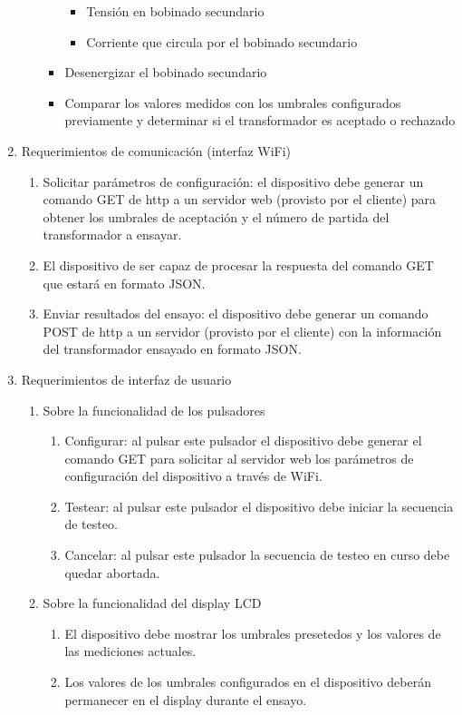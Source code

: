 \documentclass[11pt]{charter}
\begin{document}
\begin{enumerate}
\begin{enumerate}
\begin{itemize}
\begin{itemize}
			\item Tensión en bobinado secundario
			\item Corriente que circula por el bobinado secundario
			\end{itemize}
		\item Desenergizar el bobinado secundario
		\item Comparar los valores medidos con los umbrales configurados previamente y determinar si el transformador es aceptado o rechazado
		\end{itemize}
	\end{enumerate}	
\item Requerimientos de comunicación (interfaz WiFi)
	\begin{enumerate}
	\item Solicitar parámetros de configuración: el dispositivo debe generar un comando GET de http a un servidor web (provisto por el cliente) para obtener los umbrales de aceptación y el número de partida del transformador a ensayar.
	\item El dispositivo de ser capaz de procesar la respuesta del comando GET que estará en formato JSON.
	\item Enviar resultados del ensayo: el dispositivo debe generar un comando POST de http a un servidor (provisto por el cliente) con la información del transformador ensayado en formato JSON.
	\end{enumerate}
\item Requerimientos de interfaz de usuario
	\begin{enumerate}
	\item Sobre la funcionalidad de los pulsadores
		\begin{enumerate}
		\item Configurar: al pulsar este pulsador el dispositivo debe generar el comando GET para solicitar al servidor web los parámetros de configuración del dispositivo a través de WiFi.
		\item Testear: al pulsar este pulsador el dispositivo debe iniciar la secuencia de testeo.
		\item Cancelar: al pulsar este pulsador la secuencia de testeo en curso debe quedar abortada.
		\end{enumerate}
	\item Sobre la funcionalidad del display LCD
		\begin{enumerate}
		\item El dispositivo debe mostrar los umbrales presetedos y los valores de las mediciones actuales.
		\item Los valores de los umbrales configurados en el dispositivo deberán permanecer en el display  durante el ensayo.

\end{enumerate}
\end{enumerate}
\end{enumerate}
\end{document}
